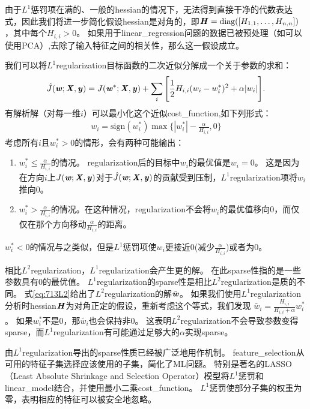 由于$L^1$惩罚项在满的、一般的\gls{hessian}的情况下，无法得到直接干净的代数表达式，因此我们将进一步简化假设\gls{hessian}是对角的，即$\boldsymbol{\mathit{H}} = \text{diag}([H_{1,1},\dots, H_{n,n}])$，其中每个$H_{i,i}>0$。
如果用于\gls{linear_regression}问题的数据已被预处理（如可以使用PCA）,去除了输入特征之间的相关性，那么这一假设成立。

我们可以将$L^1$\gls{regularization}目标函数的二次近似分解成一个关于参数的求和：
\begin{align}
 \hat J(\boldsymbol{\mathit{w}}; \boldsymbol{\mathit{X}}, \boldsymbol{\mathit{y}}) = J(\boldsymbol{\mathit{w}}^*; \boldsymbol{\mathit{X}}, \boldsymbol{\mathit{y}}) + \sum_i \Bigg [\frac{1}{2} H_{i,i} (w_i - w_i^*)^2 
 + \alpha |w_i| \Bigg].
\end{align}
有解析解（对每一维$i$）可以最小化这个近似\gls{cost_function},如下列形式：
\begin{align}
w_i = \text{sign}(w_i^*) \max\{ |w_i^*| - \frac{\alpha}{H_{i,i}} , 0\}
\end{align}
考虑所有$i$且$w_i^* > 0$的情形，会有两种可能输出：
\begin{enumerate}
\item $w_i^* \leq \frac{\alpha}{H_{i,i}}$的情况。
\gls{regularization}后的目标中$w_i$的最优值是$w_i = 0$。
这是因为在方向$i$上$J(\boldsymbol{\mathit{w}}; \boldsymbol{\mathit{X}}, \boldsymbol{\mathit{y}}) $对于$ \hat J(\boldsymbol{\mathit{w}}; \boldsymbol{\mathit{X}}, \boldsymbol{\mathit{y}})$的贡献受到压制，$L^1$\gls{regularization}项将$w_i$推向0。
\item  $w_i^* > \frac{\alpha}{H_{i,i}}$的情况。在这种情况，\gls{regularization}不会将$w_i$的最优值移向0，而仅仅在那个方向移动$\frac{\alpha}{H_{i,i}}$的距离。
\end{enumerate}
$w_i^* < 0$的情况与之类似，但是$L^1$惩罚项使$w_i$更接近0(减少$ \frac{\alpha}{H_{i,i}}$)或者为0。

相比$L^2$\gls{regularization}，$L^1$\gls{regularization}会产生更的解。
在此\gls{sparse}性指的是一些参数具有0的最优值。
$L^1$\gls{regularization}的\gls{sparse}性是相比$L^2$\gls{regularization}是质的不同。
式\ref{eq:713L2}给出了$L^2$\gls{regularization}的解$\tilde {\boldsymbol{\mathit{w}}}$。 
如果我们使用$L^1$\gls{regularization}分析时\gls{hessian}$\boldsymbol{\mathit{H}}$为对角正定的假设，重新考虑这个等式，我们发现
$\tilde{w_i} = \frac{H_{i,i}}{H_{i,i} + \alpha} w_i^*$。
如果$w_i^*$不是0，那$\tilde{w_i}$也会保持非0。 
这表明$L^2$\gls{regularization}不会导致参数变得\gls{sparse}，而$L^1$\gls{regularization}有可能通过足够大的$\alpha$实现\gls{sparse}。
 
由$L^1$\gls{regularization}导出的\gls{sparse}性质已经被广泛地用作机制。
\gls{feature_selection}从可用的特征子集选择应该使用的子集，简化了\gls{ML}问题。
特别是著名的LASSO\citep{Tibshirani95}（Least Absolute Shrinkage and
Selection Operator）模型将$L^1$惩罚和\gls{linear_model}结合，并使用最小二乘\gls{cost_function}。 
$L^1$惩罚使部分子集的权重为零，表明相应的特征可以被安全地忽略。
 
